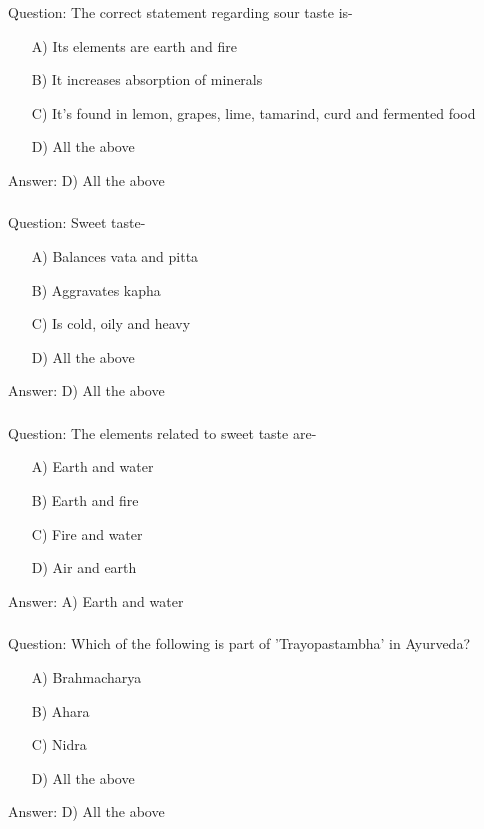 \begin{frame}[fragile]\frametitle{}

Question: The correct statement regarding sour taste is-

\begin{itemize}
\item[A)] Its elements are earth and fire
\item[B)] It increases absorption of minerals
\item[C)] It's found in lemon, grapes, lime, tamarind, curd and fermented food
\item[D)] All the above
\end{itemize}

Answer: D) All the above
\end{frame}

\begin{frame}[fragile]\frametitle{}

Question: Sweet taste-

\begin{itemize}
\item[A)] Balances vata and pitta
\item[B)] Aggravates kapha
\item[C)] Is cold, oily and heavy
\item[D)] All the above
\end{itemize}

Answer: D) All the above
\end{frame}

\begin{frame}[fragile]\frametitle{}

Question: The elements related to sweet taste are-

\begin{itemize}
\item[A)] Earth and water
\item[B)] Earth and fire
\item[C)] Fire and water
\item[D)] Air and earth
\end{itemize}

Answer: A) Earth and water
\end{frame}

\begin{frame}[fragile]\frametitle{}

Question: Which of the following is part of 'Trayopastambha' in Ayurveda?

\begin{itemize}
\item[A)] Brahmacharya
\item[B)] Ahara
\item[C)] Nidra
\item[D)] All the above
\end{itemize}

Answer: D) All the above
\end{frame}

